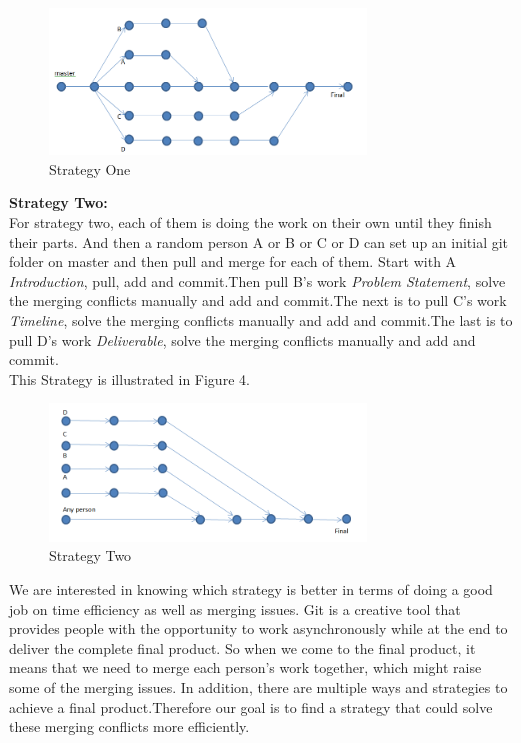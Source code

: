 \documentclass[12pt]{article}
\begin{document}
\begin{figure}[htb]
    \begin{center}
        \includegraphics[width=0.75\textwidth]{figure3.png}
    \end{center}
    \caption{Strategy One}
\end{figure}

\noindent\textbf{Strategy Two:}\\
For strategy two, each of them is doing the work on their own until they finish their parts. And then a random person A or B or C or D can set up an initial git folder on master and then pull and merge for each of them. Start with A \emph{Introduction}, pull, add and commit.Then pull B's work \emph{Problem Statement}, solve the merging conflicts manually and add and commit.The next is to pull C's work \emph{Timeline}, solve the merging conflicts manually and add and commit.The last is to pull D's work \emph{Deliverable}, solve the merging conflicts manually and add and commit. \\
 This Strategy is illustrated in Figure 4.


\begin{figure}[htb]
    \begin{center}
        \includegraphics[width=0.75\textwidth]{figure4.png}
    \end{center}
    \caption{Strategy Two}
\end{figure}
We are interested in knowing which strategy is better in terms of doing a good job on time efficiency as well as merging issues. Git is a creative tool that provides people with the opportunity to work asynchronously while at the end to deliver the complete final product. So when we come to the final product, it means that we need to merge each person's work together, which might raise some of the merging issues. In addition, there are multiple ways and strategies to achieve a final product.Therefore our goal is to find a strategy that could solve these merging conflicts more efficiently.
\end{document}
